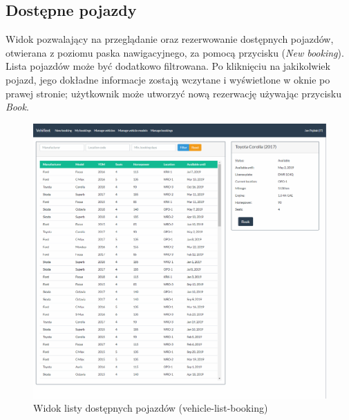 \documentclass[eng,printmode,openany]{mgr}
\begin{document}
\begin{appendices}
		\section{Dostępne pojazdy}
		Widok pozwalający na przeglądanie oraz rezerwowanie dostępnych pojazdów, otwierana z poziomu paska nawigacyjnego, za pomocą przycisku (\textit{New booking}). Lista pojazdów może być dodatkowo filtrowana. Po kliknięciu na jakikolwiek pojazd, jego dokładne informacje zostają wczytane i wyświetlone w oknie po prawej stronie; użytkownik może utworzyć nową rezerwację używając przycisku \textit{Book}.
		\begin{figure}[H]
			\centering
			\includegraphics[width=\textwidth]{images/views/vehicle-booking-2.png}
			\caption{Widok listy dostępnych pojazdów (vehicle-list-booking)}
		\end{figure}
		
		\newpage

\end{appendices}
\end{document}
